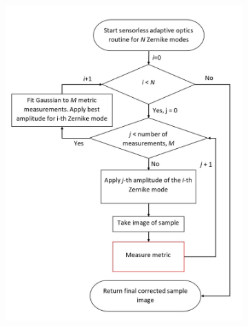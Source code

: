 \begin{figure}[h]
	\begin{subfigure}{0.425\textwidth}
		\includegraphics[scale=0.55]{./images/sensorless_correction_workflow_1.jpg}
		\caption{}
		\label{fig:sensorless_correction_workflow_1}
	\end{subfigure}
	\begin{subfigure}{0.425\textwidth}

\end{subfigure}
\end{figure}
